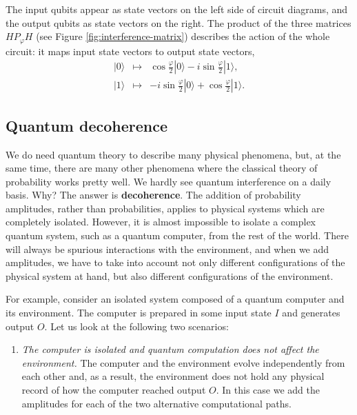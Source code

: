\documentclass{article}
\renewcommand{\footnote}[1]{\en{#1}}
\providecommand{\tightlist}{%
  \setlength{\itemsep}{0pt}\setlength{\parskip}{0pt}}
\begin{document}
The input qubits appear as state vectors on the left side of circuit diagrams, and the output qubits as state vectors on the right.
The product of the three matrices \(HP_\varphi H\) (see Figure \ref{fig:interference-matrix}) describes the action of the whole circuit: it maps input state vectors to output state vectors,\footnote{\(HP_\varphi H =\begin{bmatrix}\cos\frac{\varphi}{2} & -i\sin\frac{\varphi}{2}\\\ -i\sin\frac{\varphi}{2}& \cos\frac{\varphi}{2}\end{bmatrix}\).}
\[
  \begin{array}{lcr}
    |0\rangle & \mapsto & \cos\frac{\varphi}{2}|0\rangle - i\sin\frac{\varphi}{2}|1\rangle,
  \\|1\rangle
    & \mapsto
    &- i\sin\frac{\varphi}{2}|0\rangle + \cos\frac{\varphi}{2}|1\rangle.
  \end{array}
\]

\hypertarget{quantum-decoherence}{%
\subsection{Quantum decoherence}\label{quantum-decoherence}}

We do need quantum theory to describe many physical phenomena, but, at the same time, there are many other phenomena where the classical theory of probability works pretty well.
We hardly see quantum interference on a daily basis.
Why?
The answer is \textbf{decoherence}.
The addition of probability amplitudes, rather than probabilities, applies to physical systems which are completely isolated.
However, it is almost impossible to isolate a complex quantum system, such as a quantum computer, from the rest of the world.
There will always be spurious interactions with the environment, and when we add amplitudes, we have to take into account not only different configurations of the physical system at hand, but also different configurations of the environment.

For example, consider an isolated system composed of a quantum computer and its environment.
The computer is prepared in some input state \(I\) and generates output \(O\).
Let us look at the following two scenarios:

\begin{enumerate}
\def\labelenumi{\arabic{enumi}.}
\tightlist
\item
  \emph{The computer is isolated and quantum computation does not affect the environment.}
  The computer and the environment evolve independently from each other and, as a result, the environment does not hold any physical record of how the computer reached output \(O\).
  In this case we add the amplitudes for each of the two alternative computational paths.
\end{enumerate}
\end{document}
